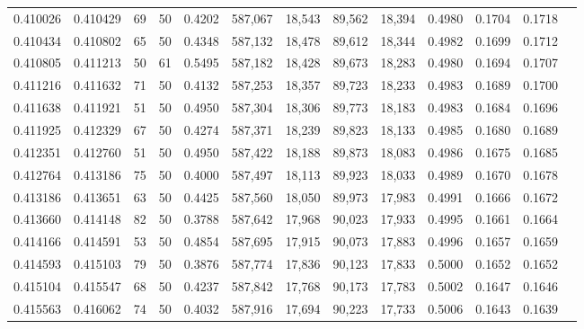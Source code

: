 \begin{tabular}{rrrrrrrrrrrrr}
0.410026 & 0.410429 &    69 &  50 &                                     0.4202 & 587,067 &  18,543 &  89,562 &  18,394 & 0.4980 & 0.1704 & 0.1718 \\
0.410434 & 0.410802 &    65 &  50 &                                     0.4348 & 587,132 &  18,478 &  89,612 &  18,344 & 0.4982 & 0.1699 & 0.1712 \\
0.410805 & 0.411213 &    50 &  61 &                                     0.5495 & 587,182 &  18,428 &  89,673 &  18,283 & 0.4980 & 0.1694 & 0.1707 \\
0.411216 & 0.411632 &    71 &  50 &                                     0.4132 & 587,253 &  18,357 &  89,723 &  18,233 & 0.4983 & 0.1689 & 0.1700 \\
0.411638 & 0.411921 &    51 &  50 &                                     0.4950 & 587,304 &  18,306 &  89,773 &  18,183 & 0.4983 & 0.1684 & 0.1696 \\
0.411925 & 0.412329 &    67 &  50 &                                     0.4274 & 587,371 &  18,239 &  89,823 &  18,133 & 0.4985 & 0.1680 & 0.1689 \\
0.412351 & 0.412760 &    51 &  50 &                                     0.4950 & 587,422 &  18,188 &  89,873 &  18,083 & 0.4986 & 0.1675 & 0.1685 \\
0.412764 & 0.413186 &    75 &  50 &                                     0.4000 & 587,497 &  18,113 &  89,923 &  18,033 & 0.4989 & 0.1670 & 0.1678 \\
0.413186 & 0.413651 &    63 &  50 &                                     0.4425 & 587,560 &  18,050 &  89,973 &  17,983 & 0.4991 & 0.1666 & 0.1672 \\
0.413660 & 0.414148 &    82 &  50 &                                     0.3788 & 587,642 &  17,968 &  90,023 &  17,933 & 0.4995 & 0.1661 & 0.1664 \\
0.414166 & 0.414591 &    53 &  50 &                                     0.4854 & 587,695 &  17,915 &  90,073 &  17,883 & 0.4996 & 0.1657 & 0.1659 \\
0.414593 & 0.415103 &    79 &  50 &                                     0.3876 & 587,774 &  17,836 &  90,123 &  17,833 & 0.5000 & 0.1652 & 0.1652 \\
0.415104 & 0.415547 &    68 &  50 &                                     0.4237 & 587,842 &  17,768 &  90,173 &  17,783 & 0.5002 & 0.1647 & 0.1646 \\
0.415563 & 0.416062 &    74 &  50 &                                     0.4032 & 587,916 &  17,694 &  90,223 &  17,733 & 0.5006 & 0.1643 & 0.1639 \\

\end{tabular}
